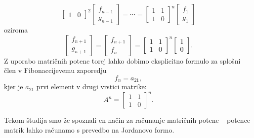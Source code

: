 \documentclass[mat1]{fmfdelo}
\begin{document}
\begin{zgled} 
\begin{equation*}
\begin{bmatrix}
            1 & 0
        \end{bmatrix}
        ^2
        \begin{bmatrix}
            f_{n-1} \\
            g_{n-1}
        \end{bmatrix}
        = \cdots =
        \begin{bmatrix}
            1 & 1 \\
            1 & 0
        \end{bmatrix}
        ^n
        \begin{bmatrix}
            f_1 \\
            g_1
        \end{bmatrix}
    \end{equation*}
    oziroma
    \begin{equation*}
        \begin{bmatrix}
            f_{n+1} \\
            g_{n+1}
        \end{bmatrix}
        =
        \begin{bmatrix}
            f_{n+1} \\
            f_n
        \end{bmatrix}
        =
        \begin{bmatrix}
            1 & 1 \\
            1 & 0
        \end{bmatrix}
        ^n
        \begin{bmatrix}
            1 \\
            0
        \end{bmatrix}.
    \end{equation*}
    Z uporabo matričnih potenc torej lahko dobimo eksplicitno formulo za splošni člen v Fibonaccijevemu zaporedju
    \begin{equation*}
        f_n = a_{21},
    \end{equation*}
    kjer je $a_{21}$ prvi element v drugi vrstici matrike:
    \begin{equation*}
        A^n =
        \begin{bmatrix}
            1 & 1 \\
            1 & 0
        \end{bmatrix}
        ^n.
    \end{equation*}

    Tekom študija smo že spoznali en način za računanje matričnih potenc -- potence matrik lahko računamo s prevedbo na Jordanovo formo.


\end{zgled}
\end{document}
